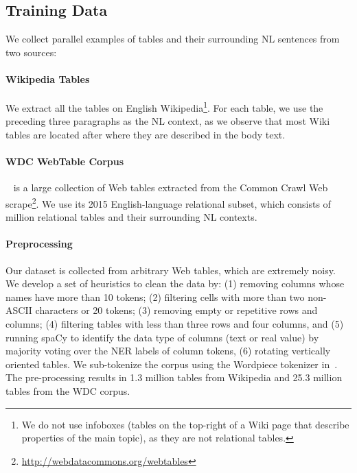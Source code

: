 \documentclass[11pt,a4paper]{article}
\renewcommand{\tt}[1]{\fontfamily{cmtt}\selectfont #1}
\begin{document}
\subsection{Training Data}
\label{sec:app:pretrain:data}

We collect parallel examples of tables and their surrounding NL sentences from two sources:
\paragraph{Wikipedia Tables} We extract all the tables 
on English Wikipedia\footnote{We do not use infoboxes (tables on the top-right of a Wiki page that describe properties of the main topic), as they are not relational tables.}. For each table, we use the preceding three paragraphs as the NL context, as we observe that most Wiki tables are located after where they are described in the body text.

\paragraph{WDC WebTable Corpus}~\cite{Lehmberg2016ALP} is a large collection of Web tables extracted from the Common Crawl Web scrape\footnote{\href{http://webdatacommons.org/webtables}{\tt http://webdatacommons.org/webtables}}. We use its 2015 English-language relational subset, which consists of  million relational tables and their surrounding NL contexts. 

\paragraph{Preprocessing}
Our dataset is collected from arbitrary Web tables, which are extremely noisy.
We develop a set of heuristics to clean the data by: 
(1) removing columns whose names have more than 10 tokens; 
(2) filtering cells with more than two non-ASCII characters or 20 tokens;
(3) removing empty or repetitive rows and columns; 
(4) filtering tables with less than three rows and four columns, and 
(5) running {\tt spaCy} to identify the data type of columns (text or real value) by majority voting over the NER labels of column tokens, 
(6) rotating vertically oriented tables.
We sub-tokenize the corpus using the Wordpiece tokenizer in~\citet{Devlin2019BERTPO}.
The pre-processing results in 1.3 million tables from Wikipedia and 25.3 million tables from the WDC corpus.
\end{document}
